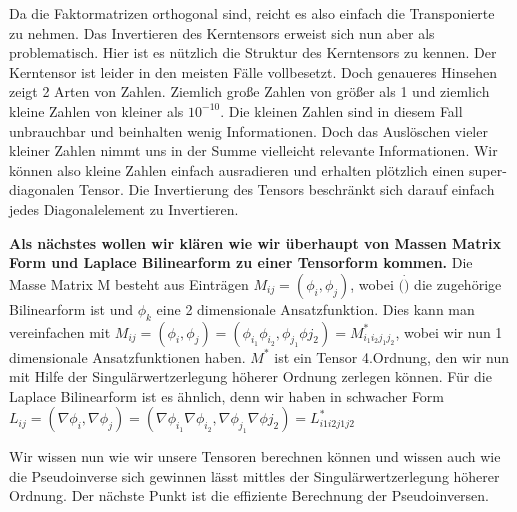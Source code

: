 Da die Faktormatrizen orthogonal sind, reicht es also einfach die Transponierte zu nehmen. Das Invertieren des Kerntensors erweist sich nun aber als problematisch.
Hier ist es nützlich die Struktur des Kerntensors zu kennen. Der Kerntensor ist leider in den meisten Fälle vollbesetzt. Doch genaueres Hinsehen zeigt 2 Arten von Zahlen. Ziemlich große Zahlen von größer als 1 und ziemlich kleine Zahlen von kleiner als $10^{-10}$. 
Die kleinen Zahlen sind in diesem Fall unbrauchbar und beinhalten wenig Informationen. Doch das Auslöschen vieler kleiner Zahlen nimmt uns in der Summe vielleicht relevante Informationen.
Wir können also kleine Zahlen einfach ausradieren und erhalten plötzlich einen super-diagonalen Tensor. Die Invertierung des Tensors beschränkt sich darauf einfach jedes Diagonalelement zu Invertieren.

\textbf{Als nächstes wollen wir klären wie wir überhaupt von Massen Matrix Form und Laplace Bilinearform zu einer Tensorform kommen.}
Die Masse Matrix M besteht aus Einträgen $M_{ij}= (\phi_i,\phi_j)$, wobei $( \dot )$ die zugehörige Bilinearform ist und $\phi_k$ eine 2 dimensionale Ansatzfunktion. Dies kann man vereinfachen mit
$M_{ij}=(\phi_i,\phi_j)=(\phi_{i_1} \phi_{i_2},\phi_{j_1} \phi{j_2})=M^{*}_{i_1 i_2 j_1 j_2}$, wobei wir nun 1 dimensionale Ansatzfunktionen haben. $M^{*}$ ist ein Tensor 4.Ordnung, den wir nun mit Hilfe der Singulärwertzerlegung höherer Ordnung zerlegen können.
Für die Laplace Bilinearform ist es ähnlich, denn wir haben in schwacher Form $L_{ij}= ( \nabla \phi_i, \nabla \phi_j)=(\nabla \phi_{i_1} \nabla \phi_{i_2}, \nabla \phi_{j_1}  \nabla \phi{j_2})=L^{*}_{i1i2j1j2}$

Wir wissen nun wie wir unsere Tensoren berechnen können und wissen auch wie die Pseudoinverse sich gewinnen lässt mittles der Singulärwertzerlegung höherer Ordnung.
Der nächste Punkt ist die effiziente Berechnung der Pseudoinversen.



